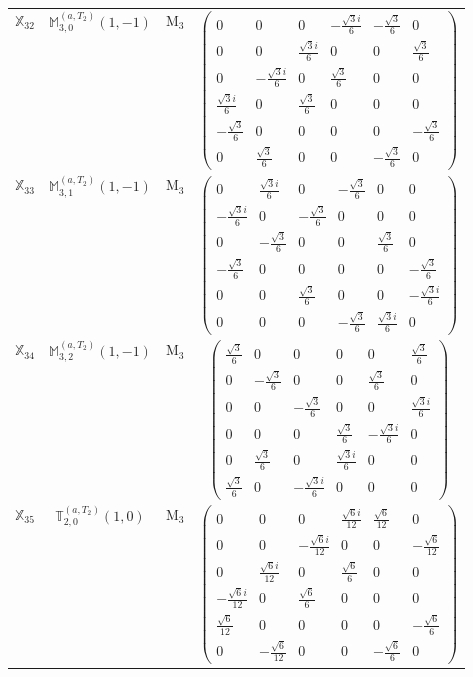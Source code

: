 \documentclass[fleqn,10pt,landscape]{article}
\begin{document}
\begin{itemize}
\begin{center}
\begin{longtable}{c|c|c|c}
$ \mathbb{X}_{32} $ & $\mathbb{M}_{3,0}^{(a,T_{2})}(1,-1)$ & M$_{3}$ & $\begin{pmatrix} 0 & 0 & 0 & - \frac{\sqrt{3} i}{6} & - \frac{\sqrt{3}}{6} & 0 \\ 0 & 0 & \frac{\sqrt{3} i}{6} & 0 & 0 & \frac{\sqrt{3}}{6} \\ 0 & - \frac{\sqrt{3} i}{6} & 0 & \frac{\sqrt{3}}{6} & 0 & 0 \\ \frac{\sqrt{3} i}{6} & 0 & \frac{\sqrt{3}}{6} & 0 & 0 & 0 \\ - \frac{\sqrt{3}}{6} & 0 & 0 & 0 & 0 & - \frac{\sqrt{3}}{6} \\ 0 & \frac{\sqrt{3}}{6} & 0 & 0 & - \frac{\sqrt{3}}{6} & 0 \end{pmatrix}$ \\
$ \mathbb{X}_{33} $ & $\mathbb{M}_{3,1}^{(a,T_{2})}(1,-1)$ & M$_{3}$ & $\begin{pmatrix} 0 & \frac{\sqrt{3} i}{6} & 0 & - \frac{\sqrt{3}}{6} & 0 & 0 \\ - \frac{\sqrt{3} i}{6} & 0 & - \frac{\sqrt{3}}{6} & 0 & 0 & 0 \\ 0 & - \frac{\sqrt{3}}{6} & 0 & 0 & \frac{\sqrt{3}}{6} & 0 \\ - \frac{\sqrt{3}}{6} & 0 & 0 & 0 & 0 & - \frac{\sqrt{3}}{6} \\ 0 & 0 & \frac{\sqrt{3}}{6} & 0 & 0 & - \frac{\sqrt{3} i}{6} \\ 0 & 0 & 0 & - \frac{\sqrt{3}}{6} & \frac{\sqrt{3} i}{6} & 0 \end{pmatrix}$ \\
$ \mathbb{X}_{34} $ & $\mathbb{M}_{3,2}^{(a,T_{2})}(1,-1)$ & M$_{3}$ & $\begin{pmatrix} \frac{\sqrt{3}}{6} & 0 & 0 & 0 & 0 & \frac{\sqrt{3}}{6} \\ 0 & - \frac{\sqrt{3}}{6} & 0 & 0 & \frac{\sqrt{3}}{6} & 0 \\ 0 & 0 & - \frac{\sqrt{3}}{6} & 0 & 0 & \frac{\sqrt{3} i}{6} \\ 0 & 0 & 0 & \frac{\sqrt{3}}{6} & - \frac{\sqrt{3} i}{6} & 0 \\ 0 & \frac{\sqrt{3}}{6} & 0 & \frac{\sqrt{3} i}{6} & 0 & 0 \\ \frac{\sqrt{3}}{6} & 0 & - \frac{\sqrt{3} i}{6} & 0 & 0 & 0 \end{pmatrix}$ \\
$ \mathbb{X}_{35} $ & $\mathbb{T}_{2,0}^{(a,T_{2})}(1,0)$ & M$_{3}$ & $\begin{pmatrix} 0 & 0 & 0 & \frac{\sqrt{6} i}{12} & \frac{\sqrt{6}}{12} & 0 \\ 0 & 0 & - \frac{\sqrt{6} i}{12} & 0 & 0 & - \frac{\sqrt{6}}{12} \\ 0 & \frac{\sqrt{6} i}{12} & 0 & \frac{\sqrt{6}}{6} & 0 & 0 \\ - \frac{\sqrt{6} i}{12} & 0 & \frac{\sqrt{6}}{6} & 0 & 0 & 0 \\ \frac{\sqrt{6}}{12} & 0 & 0 & 0 & 0 & - \frac{\sqrt{6}}{6} \\ 0 & - \frac{\sqrt{6}}{12} & 0 & 0 & - \frac{\sqrt{6}}{6} & 0 \end{pmatrix}$ \\

\end{longtable}
\end{center}
\end{itemize}
\end{document}
